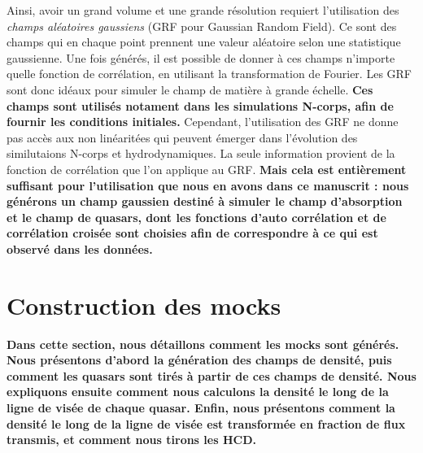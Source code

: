 \documentclass[11pt, twoside, a4paper, openright]{report}
\begin{document}
Ainsi, avoir un grand volume et une grande résolution requiert l'utilisation des \emph{champs aléatoires gaussiens} (GRF pour Gaussian Random Field). Ce sont des champs qui en chaque point prennent une valeur aléatoire selon une statistique gaussienne.
Une fois générés, il est possible de donner à ces champs n'importe quelle fonction de corrélation, en utilisant la transformation de Fourier. Les GRF sont donc idéaux pour simuler le champ de matière à grande échelle.
\textbf{Ces champs sont utilisés notament dans les simulations N-corps, afin de fournir les conditions initiales.}
Cependant, l'utilisation des GRF ne donne pas accès aux non linéaritées qui peuvent émerger dans l'évolution des similutaions N-corps et hydrodynamiques. La seule information provient de la fonction de corrélation que l'on applique au GRF.
\textbf{Mais cela est entièrement suffisant pour l'utilisation que nous en avons dans ce manuscrit : nous générons un champ gaussien destiné à simuler le champ d'absorption \lya{} et le champ de quasars, dont les fonctions d'auto corrélation et de corrélation croisée sont choisies afin de correspondre à ce qui est observé dans les données.}


\section{Construction des mocks}
\textbf{Dans cette section, nous détaillons comment les mocks sont générés.
Nous présentons d'abord la génération des champs de densité,
puis comment les quasars sont tirés à partir de ces champs de densité.
Nous expliquons ensuite comment nous calculons la densité le long de la ligne de visée de chaque quasar.
Enfin, nous présentons comment la densité le long de la ligne de visée est transformée en fraction de flux transmis, et comment nous tirons les HCD.}
\end{document}
